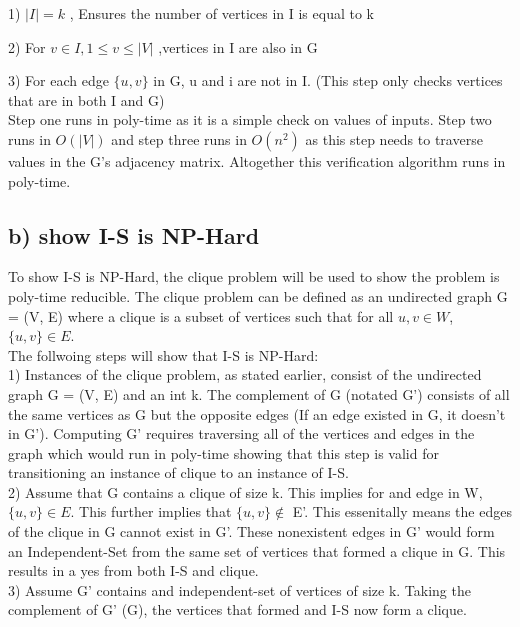 \documentclass[11pt]{article}
\begin{document}
\bigskip

1) $|I| = k$        ,     Ensures the number of vertices in I is equal to k

2) For $v \in I, 1 \leq v \leq |V|$   ,vertices in I are also in G

3) For each edge $\{u, v\}$ in G, u and i are not in I. (This step only checks vertices that are in both I and G) \\

\noindent Step one runs in poly-time as it is a simple check on values of inputs. Step two runs in $O(|V|)$ and step three runs in $O(n^2)$ as this step needs to traverse values in the G's adjacency matrix. Altogether this verification algorithm runs in poly-time.

\bigskip
\bigskip

\subsection*{b) show I-S is NP-Hard}
\noindent To show I-S is NP-Hard, the clique problem will be used to show the problem is poly-time reducible. The clique problem can be defined as an undirected graph G = (V, E) where a clique is a subset of vertices such that for all $u, v \in W$, $\{u, v\} \in E$. \\

\noindent The follwoing steps will show that I-S is NP-Hard: \\

1) Instances of the clique problem, as stated earlier, consist of the undirected graph G = (V, E) and an int k. The complement of G (notated G') consists of all the same vertices as G but the opposite edges (If an edge existed in G, it doesn't in G'). Computing G' requires traversing all of the vertices and edges in the graph which would run in poly-time showing that this step is valid for transitioning an instance of clique to an instance of I-S. \\

2) Assume that G contains a clique of size k. This implies for and edge in W, $\{u, v\} \in E$. This further implies that $\{u, v\} \notin$ E'. This essenitally means the edges of the clique in G cannot exist in G'. These nonexistent edges in G' would form an Independent-Set from the same set of vertices that formed a clique in G. This results in a yes from both I-S and clique. \\

3) Assume G' contains and independent-set of vertices of size k. Taking the complement of G' (G), the vertices that formed and I-S now form a clique. \\
\end{document}
